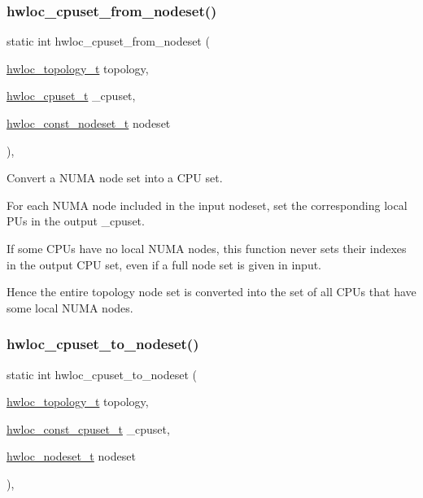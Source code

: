\subsubsection{\texorpdfstring{hwloc\+\_\+cpuset\+\_\+from\+\_\+nodeset()}{hwloc\_cpuset\_from\_nodeset()}}
{\footnotesize\ttfamily static int hwloc\+\_\+cpuset\+\_\+from\+\_\+nodeset (\begin{DoxyParamCaption}\item[{\hyperlink{a00186_ga9d1e76ee15a7dee158b786c30b6a6e38}{hwloc\+\_\+topology\+\_\+t}}]{topology,  }\item[{\hyperlink{a00183_ga4bbf39b68b6f568fb92739e7c0ea7801}{hwloc\+\_\+cpuset\+\_\+t}}]{\+\_\+cpuset,  }\item[{\hyperlink{a00183_ga2f5276235841ad66a79bedad16a5a10c}{hwloc\+\_\+const\+\_\+nodeset\+\_\+t}}]{nodeset }\end{DoxyParamCaption})\hspace{0.3cm}{\ttfamily [inline]}, {\ttfamily [static]}}



Convert a N\+U\+MA node set into a C\+PU set. 

For each N\+U\+MA node included in the input {\ttfamily nodeset}, set the corresponding local P\+Us in the output {\ttfamily \+\_\+cpuset}.

If some C\+P\+Us have no local N\+U\+MA nodes, this function never sets their indexes in the output C\+PU set, even if a full node set is given in input.

Hence the entire topology node set is converted into the set of all C\+P\+Us that have some local N\+U\+MA nodes. \mbox{\label{a00203_ga185751c1653fedbeb7cc480840f38cde}} 
\subsubsection{\texorpdfstring{hwloc\+\_\+cpuset\+\_\+to\+\_\+nodeset()}{hwloc\_cpuset\_to\_nodeset()}}
{\footnotesize\ttfamily static int hwloc\+\_\+cpuset\+\_\+to\+\_\+nodeset (\begin{DoxyParamCaption}\item[{\hyperlink{a00186_ga9d1e76ee15a7dee158b786c30b6a6e38}{hwloc\+\_\+topology\+\_\+t}}]{topology,  }\item[{\hyperlink{a00183_ga1f784433e9b606261f62d1134f6a3b25}{hwloc\+\_\+const\+\_\+cpuset\+\_\+t}}]{\+\_\+cpuset,  }\item[{\hyperlink{a00183_ga37e35730fa7e775b5bb0afe893d6d508}{hwloc\+\_\+nodeset\+\_\+t}}]{nodeset }\end{DoxyParamCaption})\hspace{0.3cm}{\ttfamily [inline]}, {\ttfamily [static]}}



